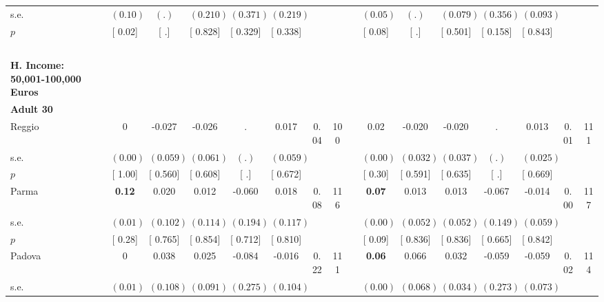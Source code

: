 \begin{longtable}{L{8em} c c c c c c c p{1em} c c c c c c c}
\quad \quad \quad \quad s.e.& $ (     0.10)$ & $ (        .)$ & $ (    0.210)$ & $ (    0.371)$ & $ (    0.219)$ & & & & $ (     0.05)$ & $ (        .)$ & $ (    0.079)$ & $ (    0.356)$ & $ (    0.093)$ & &  \\*
\quad \quad \quad \quad $ p$ & [     0.02] & [        .] & [    0.828] & [    0.329] & [    0.338] & & & & [     0.08] & [        .] & [    0.501] & [    0.158] & [    0.843] & &  \\[1em]
~\\[1em]
\textbf{H. Income: 50,001-100,000 Euros} \\*
\quad \quad \textbf{Adult 30} & & & & & & & & & & & & & & & \\* 
\quad \quad \quad Reggio& 0 &    -0.027 &    -0.026 &         . &     0.017 &      0.04 &       100 & & 0.02 &    -0.020 &    -0.020 &         . &     0.013 &      0.01 &       111  \\*
\quad \quad \quad \quad s.e.& $ (     0.00)$ & $ (    0.059)$ & $ (    0.061)$ & $ (        .)$ & $ (    0.059)$ & & & & $ (     0.00)$ & $ (    0.032)$ & $ (    0.037)$ & $ (        .)$ & $ (    0.025)$ & &  \\*
\quad \quad \quad \quad $ p$ & [     1.00] & [    0.560] & [    0.608] & [        .] & [    0.672] & & & & [     0.30] & [    0.591] & [    0.635] & [        .] & [    0.669] & &  \\[1em]
\quad \quad \quad Parma& \textbf{     0.12} &     0.020 &     0.012 &    -0.060 &     0.018 &      0.08 &       116 & & \textbf{     0.07} &     0.013 &     0.013 &    -0.067 &    -0.014 &      0.00 &       117  \\*
\quad \quad \quad \quad s.e.& $ (     0.01)$ & $ (    0.102)$ & $ (    0.114)$ & $ (    0.194)$ & $ (    0.117)$ & & & & $ (     0.00)$ & $ (    0.052)$ & $ (    0.052)$ & $ (    0.149)$ & $ (    0.059)$ & &  \\*
\quad \quad \quad \quad $ p$ & [     0.28] & [    0.765] & [    0.854] & [    0.712] & [    0.810] & & & & [     0.09] & [    0.836] & [    0.836] & [    0.665] & [    0.842] & &  \\[1em]
\quad \quad \quad Padova& 0 &     0.038 &     0.025 &    -0.084 &    -0.016 &      0.22 &       111 & & \textbf{     0.06} &     0.066 &     0.032 &    -0.059 &    -0.059 &      0.02 &       114  \\*
\quad \quad \quad \quad s.e.& $ (     0.01)$ & $ (    0.108)$ & $ (    0.091)$ & $ (    0.275)$ & $ (    0.104)$ & & & & $ (     0.00)$ & $ (    0.068)$ & $ (    0.034)$ & $ (    0.273)$ & $ (    0.073)$ & &  \\*

\end{longtable}
